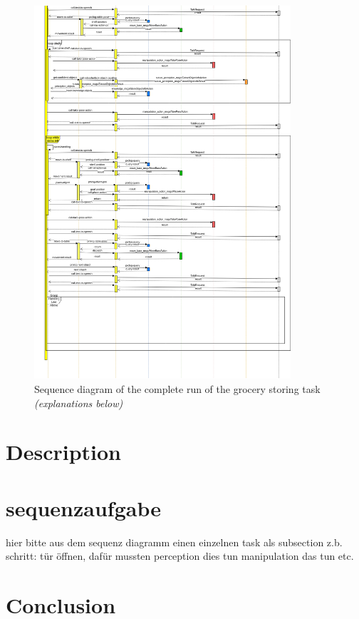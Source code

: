 \documentclass[main.tex]{subfiles}
\begin{document}
		\begin{figure}	
			\centering
			\includegraphics[width=0.85\textwidth]{pictures/diagramms/second-part-grocery-sequence.png}
			\caption{Sequence diagram of the complete run of the grocery storing task \textit{(explanations below)}}
		\end{figure}
	
	\section{Description}
	
	\section{sequenzaufgabe}
	hier bitte aus dem sequenz diagramm einen einzelnen task als subsection z.b. schritt: tür öffnen, dafür mussten perception dies tun manipulation das tun etc.
	
	\section{Conclusion}
	
	
	\endgroup
	
\end{document}
